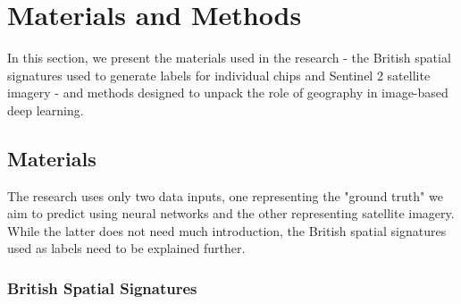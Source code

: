 \documentclass[]{interact}
\theoremstyle{plain}%
\theoremstyle{definition}
\theoremstyle{remark}
\begin{document}





\section{Materials and Methods}
\label{sec:matmet}

In this section, we present the materials used in the research - the British spatial
signatures used to generate labels for individual chips and Sentinel 2 satellite
imagery - and methods designed to unpack the role of geography in image-based deep
learning.

\subsection{Materials}

The research uses only two data inputs, one representing the "ground truth" we aim to predict using neural networks and the other representing satellite
imagery. While the latter does not need much introduction, the British spatial
signatures used as labels need to be explained further.

\subsubsection{British Spatial Signatures}
\end{document}

